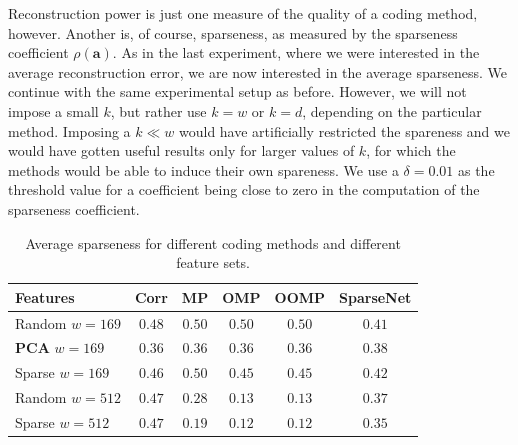 \documentclass[12pt,a4paper,oneside,english]{UPBThesis}
\begin{document}
Reconstruction power is just one measure of the quality of a coding method, however. Another is, of course, sparseness, as measured by the sparseness coefficient $\rho(\textbf{a})$. As in the last experiment, where we were interested in the average reconstruction error, we are now interested in the average sparseness. We continue with the same experimental setup as before. However, we will not impose a small $k$, but rather use $k=w$ or $k=d$, depending on the particular method. Imposing a $k \ll w$ would have artificially restricted the spareness and we would have gotten useful results only for larger values of $k$, for which the methods would be able to induce their own spareness. We use a $\delta = 0.01$ as the threshold value for a coefficient being close to zero in the computation of the sparseness coefficient.

\renewcommand{\arraystretch}{1.2}
\begin{table}
  \caption{Average sparseness for different coding methods and different feature sets.}
  \label{table:RecSparseSparseness}
  \begin{tabularx}{\textwidth}{|R|c|c|c|c|c|}
    \hline
    Features & \textbf{Corr} & \textbf{MP} & \textbf{OMP} & \textbf{OOMP} & SparseNet \tabularnewline \hline\hline
    Random $w=169$ & $0.48$ & $0.50$ & $0.50$ & $0.50$ & $0.41$ \tabularnewline \hline
    \textbf{PCA} $w=169$ & $0.36$ & $0.36$ & $0.36$ & $0.36$ & $0.38$ \tabularnewline \hline
    Sparse $w=169$ & $0.46$ & $0.50$ & $0.45$ & $0.45$ & $0.42$ \tabularnewline \hline
    Random $w=512$ & $0.47$ & $0.28$ & $0.13$ & $0.13$ & $0.37$ \tabularnewline \hline
    Sparse $w=512$ & $0.47$ & $0.19$ & $0.12$ & $0.12$ & $0.35$ \tabularnewline
    \hline
  \end{tabularx}
\end{table}
\renewcommand{\arraystretch}{1.0}
\end{document}
